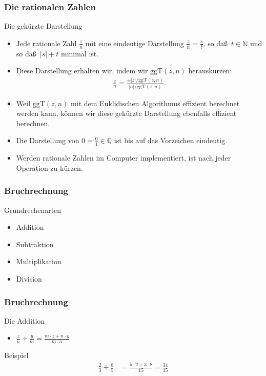 \documentclass{beamer}
\newcommand\NN{\mathbb N}
\newcommand\QQ{\mathbb Q}
\newcommand{\ggt}{\mathrm{ggT}}
\renewcommand{\oe}{\"o}
\newcommand{\ue}{\"u}
\begin{document}
\begin{frame}\frametitle{Die rationalen Zahlen}
	\begin{block}{Die gek\ue rzte Darstellung}
		\begin{itemize}
			\item Jede rationale Zahl $\frac{z}{n}$ mit eine eindeutige Darstellung $\frac{z}{n}=\frac{s}{t}$, so da\ss\ $t\in\NN$ und so da\ss\ $|s|+t$ minimal ist.
			\item Diese Darstellung erhalten wir, indem wir $\ggt(z,n)$ herausk\ue rzen:
				\begin{align*}
					\frac{z}{n}=\frac{\pm|z|/\ggt(z,n)}{|n|/\ggt(z,n)}.
				\end{align*}
			\item Weil $\ggt(z,n)$ mit dem Euklidischen Algorithmus effizient berechnet werden kann, k\oe nnen wir diese gek\ue rzte Darstellung ebenfalls effizient berechnen.
			\item Die Darstellung von $0=\frac{0}{1}\in\QQ$ ist bis auf das Vorzeichen eindeutig.
			\item Werden rationale Zahlen im Computer implementiert, ist nach jeder Operation zu k\ue rzen.
		\end{itemize}
	\end{block}
\end{frame}

\begin{frame}\frametitle{Bruchrechnung}
	\begin{block}{Grundrechenarten}
		\begin{itemize}
			\item Addition
			\item Subtraktion
			\item Multiplikation
			\item Division
		\end{itemize}
	\end{block}
\end{frame}

\begin{frame}\frametitle{Bruchrechnung}
	\begin{block}{Die Addition}
		\begin{itemize}
			\item  $\displaystyle\frac{z}{n}+\frac{y}{m}=\frac{m\cdot z+n\cdot y}{m\cdot n}	$
		\end{itemize}
	\end{block}
	\begin{block}{Beispiel}
	\begin{align*}
		\frac{2}{3}+\frac{8}{5}&=\frac{5\cdot 2+3\cdot 8}{15}=\frac{34}{15}
	\end{align*}
	\end{block}
\end{frame}
\end{document}
